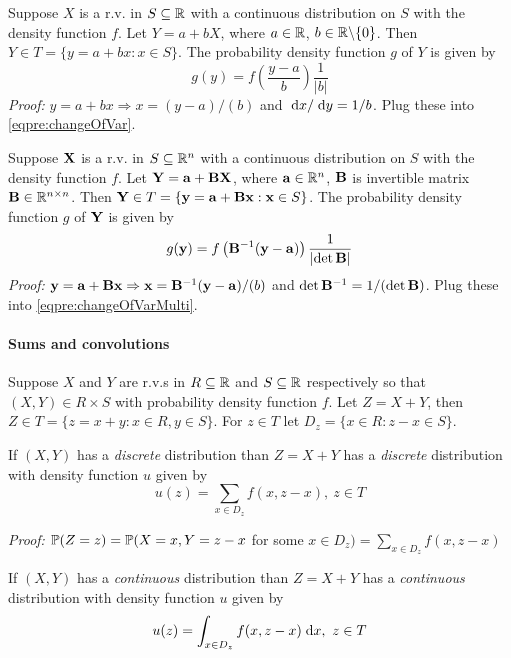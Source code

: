 Suppose $X$ is a r.v. in $S \subseteq \mathbb{R}$ with a continuous distribution on $S$ with the density function $f$.
Let $Y = a + bX$, where $a \in \mathbb{R}$, $b \in \mathbb{R} \backslash \{0\}$. Then $Y \in T = \{y = a + bx: x \in S\}$.
The probability density function $g$ of $Y$ is given by
\begin{equation}
g(y) = f\left(\frac{y - a}{b}\right) \frac{1}{\lvert b \rvert}
\end{equation}
\emph{Proof:} $y = a + bx \Rightarrow x = (y - a)/(b)$ and $\; \text{d} x / \; \text{d} y = 1 / b$. Plug these into \eqref{eqpre:changeOfVar}.


Suppose $\mathbf{X}$ is a r.v. in $S \subseteq \mathbb{R}^n$ with a continuous distribution on $S$ with the density function $f$.
Let $\mathbf{Y} = \mathbf{a} + \mathbf{B}\mathbf{X}$, where $\mathbf{a} \in \mathbb{R}^n$, $\mathbf{B}$ is invertible matrix $\mathbf{B} \in \mathbb{R}^{n \times n}$. Then $\mathbf{Y} \in T = \{\mathbf{y} = \mathbf{a} + \mathbf{B}\mathbf{x}: \mathbf{x} \in S\}$.
The probability density function $g$ of $\mathbf{Y}$ is given by
\begin{equation}
g(\mathbf{y}) = f\left(\mathbf{B}^{-1}(\mathbf{y} - \mathbf{a})\right) \frac{1}{\lvert \det \mathbf{B} \rvert}
\end{equation}
\emph{Proof:} $\mathbf{y} = \mathbf{a} + \mathbf{B}\mathbf{x} \Rightarrow \mathbf{x} = \mathbf{B}^{-1}(\mathbf{y} - \mathbf{a})/(b)$ and $\det \mathbf{B}^{-1} = 1 / (\det \mathbf{B})$. Plug these into \eqref{eqpre:changeOfVarMulti}.

\paragraph{Sums and convolutions}

Suppose $X$ and $Y$ are r.v.s in $R \subseteq \mathbb{R}$ and $S \subseteq \mathbb{R}$ respectively so that $(X, Y) \in R \times S$ with probability density function $f$.
Let $Z = X + Y$, then $Z \in T = \{z = x + y: x \in R, y \in S\}$.
For $z \in T$ let $D_z = \{x \in R: z - x \in S\}$.

If $(X, Y)$ has a \emph{discrete} distribution than $Z = X + Y$ has a \emph{discrete} distribution with density function $u$ given by
\begin{equation}
u(z) = \sum_{x \in D_z} f(x, z-x), \ z \in T
\end{equation}

\emph{Proof:} $\mathbb{P}(Z = z) = \mathbb{P}(X = x, Y = z - x$ for some $x \in D_z) = \sum_{x \in D_z} f(x, z-x)$

If $(X, Y)$ has a \emph{continuous} distribution than $Z = X + Y$ has a \emph{continuous} distribution with density function $u$ given by
\begin{equation}
u(z) = \int_{x \in D_z} f(x, z-x) \; \text{d} x, \ z \in T
\end{equation}

